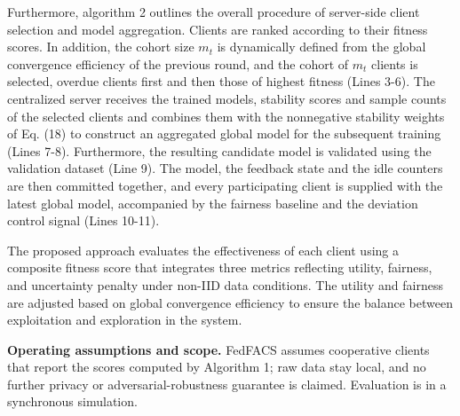 \documentclass[pdflatex,sn-mathphys-num,oneside]{sn-jnl}%
\theoremstyle{thmstyleone}%
\theoremstyle{thmstyletwo}%
\theoremstyle{thmstylethree}%
\begin{document}
Furthermore, algorithm 2 outlines the overall procedure of server-side client selection and model aggregation. Clients are ranked according to their fitness scores. In addition, the cohort size $m_t$ is dynamically defined from the global convergence efficiency of the previous round, and the cohort of $m_t$ clients is selected, overdue clients first and then those of highest fitness (Lines 3-6). The centralized server receives the trained models, stability scores and sample counts of the selected clients and combines them with the nonnegative stability weights of Eq. (18) to construct an aggregated global model for the subsequent training (Lines 7-8). Furthermore, the resulting candidate model is validated using the validation dataset (Line 9). The model, the feedback state and the idle counters are then committed together, and every participating client is supplied with the latest global model, accompanied by the fairness baseline and the deviation control signal (Lines 10-11).


The proposed approach evaluates the effectiveness of each client using a composite fitness score that integrates three metrics reflecting utility, fairness, and uncertainty penalty under non-IID data conditions. The utility and fairness are adjusted based on global convergence efficiency to ensure the balance between exploitation and exploration in the system.

\textbf{Operating assumptions and scope.} FedFACS assumes cooperative clients that report the scores computed by Algorithm 1; raw data stay local, and no further privacy or adversarial-robustness guarantee is claimed. Evaluation is in a synchronous simulation.
\end{document}
